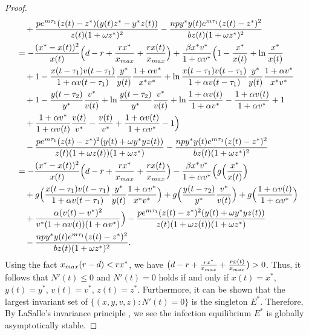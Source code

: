 \documentclass[10pt,a4paper]{amsart}
\numberwithin{equation}{section}
\begin{document}
\begin{proof}
\begin{align*}
&\quad +\frac{pe^{m\tau_1}(z(t)-z^{*})(y(t)z^{*}-y^{*}z(t))}{z(t)(1+\omega z^{*})^{2}}
 -\frac{npy^{*}y(t)e^{m\tau_1}(z(t)-z^{*})^{2}}{bz(t)(1+\omega z^{*})^{2}} \\
&= -\frac{(x^{*}-x(t))^{2}}{x(t)}\Big(d-r+\frac{rx^{*}}{x_{\rm max}}
 +\frac{rx(t)}{x_{\rm max}}\Big)+\frac{\beta x^{*}v^{*}}{1+\alpha v^{*}}
 \Big(1-\frac{x^{*}}{x(t)}+\ln\frac{x^{*}}{x(t)} \\
&\quad +1-\frac{ x(t-\tau_{1})v(t-\tau_{1})}{1+\alpha v(t-\tau_{1})}
 \frac{y^{*}}{y(t)}\frac{1+\alpha v^{*}}{x^{*}v^{*}}
 +\ln\frac{ x(t-\tau_{1})v(t-\tau_{1})}{1+\alpha v(t-\tau_{1})}\frac{y^{*}}{y(t)}
 \frac{1+\alpha v^{*}}{x^{*}v^{*}} \\
&\quad +1-\frac{y(t-\tau_{2})}{y^{*}}\frac{v^{*}}{v(t)}+\ln\frac{y(t-\tau_{2})}{y^{*}}\frac{v^{*}}{v(t)}+\ln\frac{1+\alpha v(t)}{1+\alpha v^{*}}
-\frac{1+\alpha v(t)}{1+\alpha v^{*}}+1 \\
&\quad +\frac{1+\alpha v^{*}}{1+\alpha v(t)}\frac{v(t)}{v^{*}}
 -\frac{v(t)}{v^{*}}+\frac{1+\alpha v(t)}{1+\alpha v^{*}}-1\Big)\\
&\quad -\frac{pe^{m\tau_1}(z(t)-z^{*})^{2}(y(t)+\omega y^{*}yz(t))}{z(t)
 (1+\omega z(t))(1+\omega z^{*})}
 -\frac{npy^{*}y(t)e^{m\tau_1}(z(t)-z^{*})^{2}}{bz(t)(1+\omega z^{*})^{2}} \\
&= -\frac{(x^{*}-x(t))^{2}}{x(t)}\Big(d-r+\frac{rx^{*}}{x_{\rm max}}
 +\frac{rx(t)}{x_{\rm max}}\Big)
 -\frac{\beta x^{*}v^{*}}{1+\alpha v^{*}}\Big(g\Big(\frac{x^{*}}{x(t)}\Big) \\
&\quad +g\Big(\frac{ x(t-\tau_{1})v(t-\tau_{1})}{1+\alpha v(t-\tau_{1})}
 \frac{y^{*}}{y(t)}\frac{1+\alpha v^{*}}{x^{*}v^{*}}\Big)
 +g\Big(\frac{y(t-\tau_{2})}{y^{*}}\frac{v^{*}}{v(t)}\Big)
 +g\Big(\frac{1+\alpha v(t)}{1+\alpha v^{*}}\Big)\\
&\quad +\frac{\alpha(v(t)-v^{*})^{2}}{v^{*}(1+\alpha v(t))(1+\alpha v^{*})} \Big)
 -\frac{pe^{m\tau_1}(z(t)-z^{*})^{2}(y(t)+\omega y^{*}yz(t))}{z(t)(1+\omega z(t))
  (1+\omega z^{*})}\\
&\quad -\frac{npy^{*}y(t)e^{m\tau_1}(z(t)-z^{*})^{2}}{bz(t)(1+\omega z^{*})^{2}}.
\end{align*}
Using the fact $x_{\rm max}(r-d)<rx^{*}$, we have 
$\big(d-r+\frac{rx^{*}}{x_{\rm max}}+\frac{rx(t)}{x_{\rm max}}\big)>0$. 
Thus, it follows that $N'(t)\leq 0$ and
$N'(t)= 0$  holds if and only if  $x(t)=x^{*}$, $y(t)=y^{*}$, $v(t)=v^{*}$, 
$z(t)=z^{*}$.
Furthermore, it can be shown that the largest invariant set of 
$\{(x,y,v,z)\!:  N'(t)=0\}$ is the singleton $E^*$. Therefore, 
By LaSalle's invariance  principle \cite{HV}, we see the infection equilibrium  
$ E^{*}$ is  globally asymptotically stable.
\end{proof}
\end{document}
